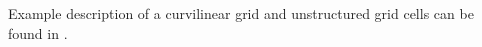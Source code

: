 Example \CDO description of a curvilinear grid and unstructured grid cells can be found
in .









